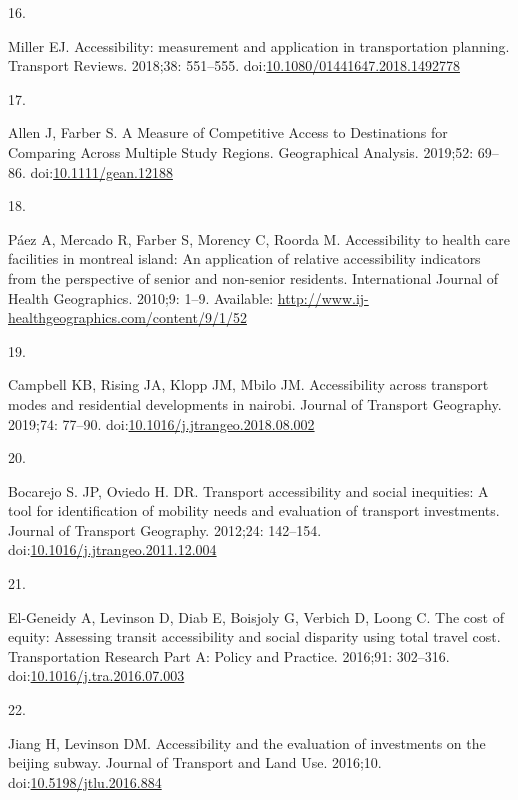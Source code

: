 \documentclass[10pt,letterpaper]{article}
\newlength{\cslhangindent}
\newlength{\csllabelwidth}
\newlength{\cslentryspacingunit} %
\newenvironment{CSLReferences}[2] %
 {%
  \setlength{\parindent}{0pt}
  \ifodd #1
  \let\oldpar\par
  \def\par{\hangindent=\cslhangindent\oldpar}
  \fi
  \setlength{\parskip}{#2\cslentryspacingunit}
 }%
 {}
\newcommand{\CSLLeftMargin}[1]{\parbox[t]{\csllabelwidth}{#1}}
\newcommand{\CSLRightInline}[1]{\parbox[t]{\linewidth - \csllabelwidth}{#1}\break}
\begin{document}
\begin{CSLReferences}{0}{0}
\leavevmode{}%
\CSLLeftMargin{16. }%
\CSLRightInline{Miller EJ. Accessibility: measurement and application in
transportation planning. Transport Reviews. 2018;38: 551--555.
doi:\href{https://doi.org/10.1080/01441647.2018.1492778}{10.1080/01441647.2018.1492778}}

\leavevmode{}%
\CSLLeftMargin{17. }%
\CSLRightInline{Allen J, Farber S. A Measure of Competitive Access to
Destinations for Comparing Across Multiple Study Regions. Geographical
Analysis. 2019;52: 69--86.
doi:\href{https://doi.org/10.1111/gean.12188}{10.1111/gean.12188}}

\leavevmode{}%
\CSLLeftMargin{18. }%
\CSLRightInline{Páez A, Mercado R, Farber S, Morency C, Roorda M.
Accessibility to health care facilities in montreal island: An
application of relative accessibility indicators from the perspective of
senior and non-senior residents. International Journal of Health
Geographics. 2010;9: 1--9. Available:
\url{http://www.ij-healthgeographics.com/content/9/1/52}}

\leavevmode{}%
\CSLLeftMargin{19. }%
\CSLRightInline{Campbell KB, Rising JA, Klopp JM, Mbilo JM.
Accessibility across transport modes and residential developments in
nairobi. Journal of Transport Geography. 2019;74: 77--90.
doi:\href{https://doi.org/10.1016/j.jtrangeo.2018.08.002}{10.1016/j.jtrangeo.2018.08.002}}

\leavevmode{}%
\CSLLeftMargin{20. }%
\CSLRightInline{Bocarejo S. JP, Oviedo H. DR. Transport accessibility
and social inequities: A tool for identification of mobility needs and
evaluation of transport investments. Journal of Transport Geography.
2012;24: 142--154.
doi:\href{https://doi.org/10.1016/j.jtrangeo.2011.12.004}{10.1016/j.jtrangeo.2011.12.004}}

\leavevmode{}%
\CSLLeftMargin{21. }%
\CSLRightInline{El-Geneidy A, Levinson D, Diab E, Boisjoly G, Verbich D,
Loong C. The cost of equity: {Assessing} transit accessibility and
social disparity using total travel cost. Transportation Research Part
A: Policy and Practice. 2016;91: 302--316.
doi:\href{https://doi.org/10.1016/j.tra.2016.07.003}{10.1016/j.tra.2016.07.003}}

\leavevmode{}%
\CSLLeftMargin{22. }%
\CSLRightInline{Jiang H, Levinson DM. Accessibility and the evaluation
of investments on the beijing subway. Journal of Transport and Land Use.
2016;10.
doi:\href{https://doi.org/10.5198/jtlu.2016.884}{10.5198/jtlu.2016.884}}


\end{CSLReferences}
\end{document}
